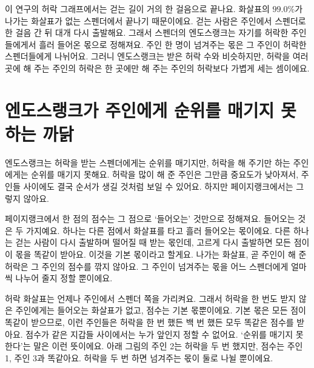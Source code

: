 이 연구의 허락 그래프에서는 걷는 길이 거의 한 걸음으로 끝나요. 화살표의 $99.0\%$가 나가는 화살표가 없는 스펜더에서 끝나기 때문이에요. 걷는 사람은 주인에서 스펜더로 한 걸음 간 뒤 대개 다시 출발해요. 그래서 스펜더의 엔도스랭크는 자기를 허락한 주인들에게서 흘러 들어온 몫으로 정해져요. 주인 한 명이 넘겨주는 몫은 그 주인이 허락한 스펜더들에게 나뉘어요. 그러니 엔도스랭크는 받은 허락 수와 비슷하지만, 허락을 여러 곳에 해 주는 주인의 허락은 한 곳에만 해 주는 주인의 허락보다 가볍게 세는 셈이에요.

\section*{엔도스랭크가 주인에게 순위를 매기지 못하는 까닭}

엔도스랭크는 허락을 받는 스펜더에게는 순위를 매기지만, 허락을 해 주기만 하는 주인에게는 순위를 매기지 못해요. 허락을 많이 해 준 주인은 그만큼 중요도가 낮아져서, 주인들 사이에도 결국 순서가 생길 것처럼 보일 수 있어요. 하지만 페이지랭크에서는 그렇지 않아요.

페이지랭크에서 한 점의 점수는 그 점으로 ‘들어오는’ 것만으로 정해져요. 들어오는 것은 두 가지예요. 하나는 다른 점에서 화살표를 타고 흘러 들어오는 몫이에요. 다른 하나는 걷는 사람이 다시 출발하며 떨어질 때 받는 몫인데, 고르게 다시 출발하면 모든 점이 이 몫을 똑같이 받아요. 이것을 기본 몫이라고 할게요. 나가는 화살표, 곧 주인이 해 준 허락은 그 주인의 점수를 깎지 않아요. 그 주인이 넘겨주는 몫을 어느 스펜더에게 얼마씩 나누어 줄지 정할 뿐이에요.

허락 화살표는 언제나 주인에서 스펜더 쪽을 가리켜요. 그래서 허락을 한 번도 받지 않은 주인에게는 들어오는 화살표가 없고, 점수는 기본 몫뿐이에요. 기본 몫은 모든 점이 똑같이 받으므로, 이런 주인들은 허락을 한 번 했든 백 번 했든 모두 똑같은 점수를 받아요. 점수가 같은 지갑들 사이에서는 누가 앞인지 정할 수 없어요. ‘순위를 매기지 못한다’는 말은 이런 뜻이에요. 아래 그림의 주인 2는 허락을 두 번 했지만, 점수는 주인 1, 주인 3과 똑같아요. 허락을 두 번 하면 넘겨주는 몫이 둘로 나뉠 뿐이에요.

